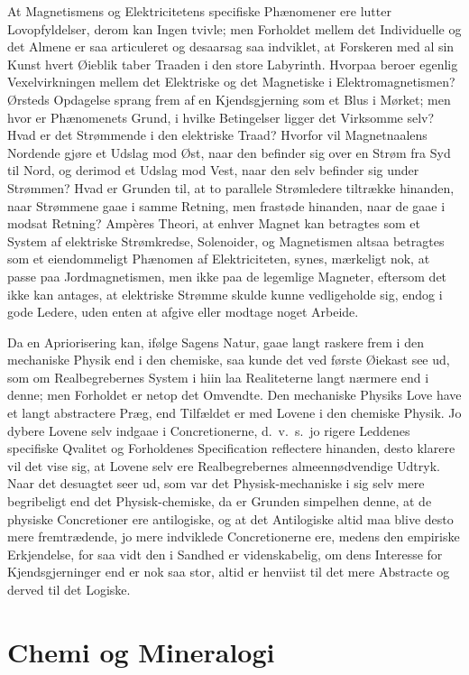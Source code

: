 \documentclass[12pt]{book}
\newcommand{\apage}[1]{\marginnote{\footnotesize\textit{[#1]}}}
\begin{document}
At Magnetismens og Elektricitetens specifiske Phænomener ere lutter
Lovopfyldelser, derom kan Ingen tvivle; men Forholdet mellem det
Individuelle og det Almene er saa articuleret og desaarsag saa indviklet,
at Forskeren med al sin Kunst hvert Øieblik taber Traaden i den store
Labyrinth. Hvorpaa beroer egenlig Vexelvirkningen mellem det Elektriske og
det Magnetiske i Elektromagnetismen? Ørsteds Opdagelse sprang frem af en
Kjendsgjerning som et Blus i Mørket; men hvor er Phænomenets Grund, i hvilke
Betingelser ligger det Virksomme selv? Hvad er det Strømmende i den
elektriske Traad? Hvorfor vil Magnetnaalens Nordende gjøre et Udslag mod
Øst, naar den befinder sig over en Strøm fra Syd til Nord, og derimod et
\apage{150} Udslag mod Vest, naar den selv befinder sig under Strømmen? Hvad er Grunden
til, at to parallele Strømledere tiltrække hinanden, naar Strømmene gaae i
samme Retning, men frastøde hinanden, naar de gaae i modsat Retning?
Ampères Theori, at enhver Magnet kan betragtes som et System af elektriske
Strømkredse, Solenoider, og Magnetismen altsaa betragtes som et
eiendommeligt Phænomen af Elektriciteten, synes, mærkeligt nok, at passe
paa Jordmagnetismen, men ikke paa de legemlige Magneter, eftersom det ikke
kan antages, at elektriske Strømme skulde kunne vedligeholde sig, endog i
gode Ledere, uden enten at afgive eller modtage noget Arbeide.

Da en Apriorisering kan, ifølge Sagens Natur, gaae langt raskere frem i den
mechaniske Physik end i den chemiske, saa kunde det ved første Øiekast see
ud, som om Realbegrebernes System i hiin laa Realiteterne langt nærmere end
i denne; men Forholdet er netop det Omvendte. Den mechaniske Physiks Love
have et langt abstractere Præg, end Tilfældet er med Lovene i den chemiske
Physik. Jo dybere Lovene selv indgaae i Concretionerne, d.\ v.\ s.\ jo rigere
Leddenes specifiske Qvalitet og Forholdenes Specification reflectere
hinanden, desto klarere vil det vise sig, at Lovene selv ere
Realbegrebernes almeennødvendige Udtryk. Naar det desuagtet seer ud, som
var det Physisk-mechaniske i sig selv mere begribeligt end det
Physisk-chemiske, da er Grunden simpelhen denne, at de physiske
Concretioner ere antilogiske, og at det Antilogiske altid maa blive desto
mere fremtrædende, jo mere \apage{151} indviklede Concretionerne ere, medens den
empiriske Erkjendelse, for saa vidt den i Sandhed er videnskabelig, om dens
Interesse for Kjendsgjerninger end er nok saa stor, altid er henviist til
det mere Abstracte og derved til det Logiske.

\section{Chemi og Mineralogi}
\label{sec:15}
\end{document}
